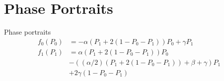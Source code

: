 \documentclass[smaller,aspectratio=169, toc=bibliography]{beamer}
\begin{document}
\section*{Phase Portraits}
\begin{frame}[fragile]{Phase portraits}
\begin{equation}
\label{two dimension}
\begin{aligned}
 f_0(P_0) &= -\alpha( P_1 + 2( 1 - P_0-P_1 )) P_0 + \gamma P_1 \\
 f_1(P_1) &=  \alpha( P_1 + 2( 1 - P_0 - P_1 )) P_0    \\
        &- ((\alpha/2)( P_1 + 2(1 - P_0 - P_1)) + \beta + \gamma ) P_1  \\
        &+ 2 \gamma ( 1 - P_0 - P_1)        
\end{aligned}
\end{equation}
\end{frame}
\end{document}
